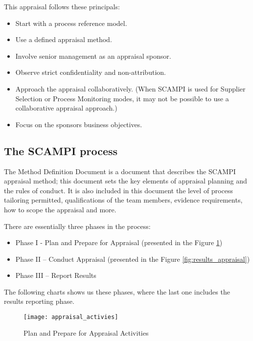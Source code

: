 This appraisal follows these principals:
\begin{itemize}
	\item Start with a process reference model.
	\item Use a defined appraisal method.
	\item Involve senior management as an appraisal sponsor.
	\item Observe strict confidentiality and non-attribution.
	\item Approach the appraisal collaboratively. (When SCAMPI is used for Supplier Selection or Process Monitoring modes, it may not be
	possible to use a collaborative appraisal approach.)
	\item Focus on the sponsors business objectives.
\end{itemize}

\subsection{The SCAMPI process}

The Method Definition Document \citep{SCAMPITeam2013} is a document that describes the SCAMPI appraisal method; this document sets the key elements of appraisal planning and the rules of conduct. It is also included in this document the level of process tailoring permitted, qualifications of the team members, evidence requirements, how to scope the appraisal and more.

There are essentially three phases in the process:
\begin{itemize}
	\item Phase I - Plan and Prepare for Appraisal (presented in the Figure \ref{fig:plan_appraisal})
	\item Phase II – Conduct Appraisal (presented in the Figure \ref{fig:results_appraisal})
	\item Phase III – Report Results
\end{itemize}

The following charts shows us these phases, where the last one includes the results reporting phase.

\begin{figure}[h]
	\begin{center}
		\leavevmode
		\texttt{[image: appraisal\_activies]}
		\caption{Plan and Prepare for Appraisal Activities}
		\label{fig:plan_appraisal}
	\end{center}
\end{figure}


